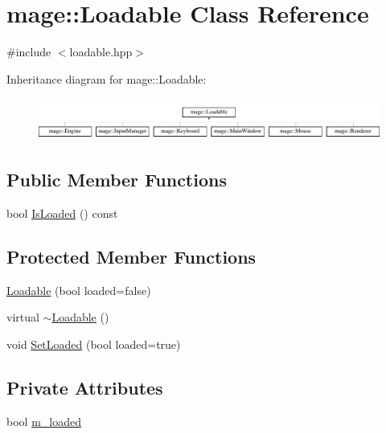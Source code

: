 \hypertarget{classmage_1_1_loadable}{}\section{mage\+:\+:Loadable Class Reference}
\label{classmage_1_1_loadable}


{\ttfamily \#include $<$loadable.\+hpp$>$}

Inheritance diagram for mage\+:\+:Loadable\+:\begin{figure}[H]
\begin{center}
\leavevmode
\includegraphics[height=1.393035cm]{classmage_1_1_loadable}
\end{center}
\end{figure}
\subsection*{Public Member Functions}
\begin{DoxyCompactItemize}
\item 
bool \hyperlink{classmage_1_1_loadable_a53cfa5beb9b44bbcda0d6166a54b8cb6}{Is\+Loaded} () const
\end{DoxyCompactItemize}
\subsection*{Protected Member Functions}
\begin{DoxyCompactItemize}
\item 
\hyperlink{classmage_1_1_loadable_afbdcb287b5e20583899a27a1c244bc7d}{Loadable} (bool loaded=false)
\item 
virtual \hyperlink{classmage_1_1_loadable_a009ef5ebc9baf803b19110d937922b41}{$\sim$\+Loadable} ()
\item 
void \hyperlink{classmage_1_1_loadable_a932ff8b287c8e68e30a13804cba08ff2}{Set\+Loaded} (bool loaded=true)
\end{DoxyCompactItemize}
\subsection*{Private Attributes}
\begin{DoxyCompactItemize}
\item 
bool \hyperlink{classmage_1_1_loadable_a993963fbfeb0f2e2ab9616bf7ef6a0f7}{m\+\_\+loaded}
\end{DoxyCompactItemize}


